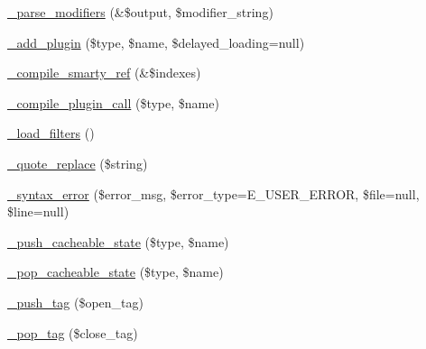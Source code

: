 \begin{DoxyCompactItemize}
\item 
\mbox{\hyperlink{class_smarty___compiler_afd43133d5f05a358b1a76cf60805119e}{\+\_\+parse\+\_\+modifiers}} (\&\$output, \$modifier\+\_\+string)
\item 
\mbox{\hyperlink{class_smarty___compiler_aaaf68202b4841dc6c783be9b8911d36b}{\+\_\+add\+\_\+plugin}} (\$type, \$name, \$delayed\+\_\+loading=null)
\item 
\mbox{\hyperlink{class_smarty___compiler_ab320c43ef5206f5be26190264ee8e87d}{\+\_\+compile\+\_\+smarty\+\_\+ref}} (\&\$indexes)
\item 
\mbox{\hyperlink{class_smarty___compiler_ac9e7526111cdf46d56d1515813a26e09}{\+\_\+compile\+\_\+plugin\+\_\+call}} (\$type, \$name)
\item 
\mbox{\hyperlink{class_smarty___compiler_a78b7b3c8ce574b2dcfcbd48070061740}{\+\_\+load\+\_\+filters}} ()
\item 
\mbox{\hyperlink{class_smarty___compiler_af44c0aadf5d97fe891cc281c1de622e5}{\+\_\+quote\+\_\+replace}} (\$string)
\item 
\mbox{\hyperlink{class_smarty___compiler_a9cf75cd6abe553dd33660de24527d0aa}{\+\_\+syntax\+\_\+error}} (\$error\+\_\+msg, \$error\+\_\+type=E\+\_\+\+U\+S\+E\+R\+\_\+\+E\+R\+R\+OR, \$file=null, \$line=null)
\item 
\mbox{\hyperlink{class_smarty___compiler_a11b685691a5b572278f01ff01c31afbe}{\+\_\+push\+\_\+cacheable\+\_\+state}} (\$type, \$name)
\item 
\mbox{\hyperlink{class_smarty___compiler_a485abbea43510914e066dcc2f0ebbfc0}{\+\_\+pop\+\_\+cacheable\+\_\+state}} (\$type, \$name)
\item 
\mbox{\hyperlink{class_smarty___compiler_a04fd5536a55810e196b1da7b119eb5e6}{\+\_\+push\+\_\+tag}} (\$open\+\_\+tag)
\item 
\mbox{\hyperlink{class_smarty___compiler_a4236d065e7b94b1189e57274249eb6db}{\+\_\+pop\+\_\+tag}} (\$close\+\_\+tag)
\end{DoxyCompactItemize}
